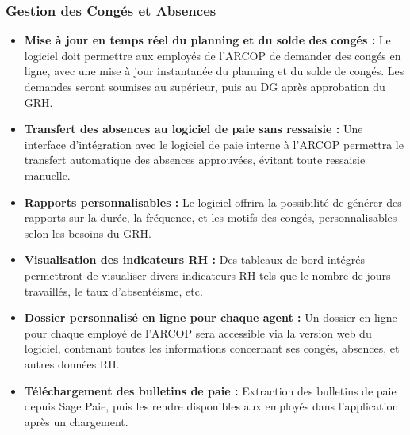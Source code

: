 \subsubsection{Gestion des Congés et Absences}
\begin{itemize}
    \item \textbf{Mise à jour en temps réel du planning et du solde des congés :} Le logiciel doit permettre aux employés de l'ARCOP de demander des congés en ligne, avec une mise à jour instantanée du planning et du solde de congés. Les demandes seront soumises au supérieur, puis au DG après approbation du GRH.
    
    \item \textbf{Transfert des absences au logiciel de paie sans ressaisie :} Une interface d'intégration avec le logiciel de paie interne à l'ARCOP permettra le transfert automatique des absences approuvées, évitant toute ressaisie manuelle.
    
    \item \textbf{Rapports personnalisables :} Le logiciel offrira la possibilité de générer des rapports sur la durée, la fréquence, et les motifs des congés, personnalisables selon les besoins du GRH.
    
    \item \textbf{Visualisation des indicateurs RH :} Des tableaux de bord intégrés permettront de visualiser divers indicateurs RH tels que le nombre de jours travaillés, le taux d'absentéisme, etc.
    
    \item \textbf{Dossier personnalisé en ligne pour chaque agent :} Un dossier en ligne pour chaque employé de l'ARCOP sera accessible via la version web du logiciel, contenant toutes les informations concernant ses congés, absences, et autres données RH.
    
    \item \textbf{Téléchargement des bulletins de paie :} Extraction des bulletins de paie depuis Sage Paie, puis les rendre disponibles aux employés dans l'application après un chargement.
\end{itemize}

